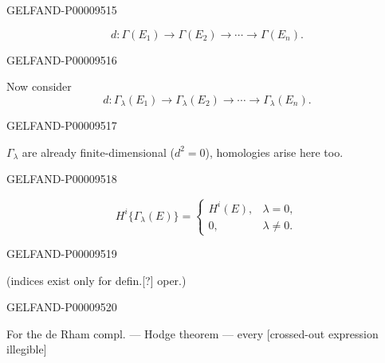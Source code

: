 \begin{GelfandAdjacentEvidence}{GELFAND-P000095}{15}

\begin{equation*}
d:\Gamma(E_1)\longrightarrow\Gamma(E_2)\longrightarrow\cdots\longrightarrow\Gamma(E_n).
\end{equation*}
\end{GelfandAdjacentEvidence}
\begin{GelfandAdjacentEvidence}{GELFAND-P000095}{16}

Now consider
\begin{equation*}
d:\Gamma_\lambda(E_1)\longrightarrow\Gamma_\lambda(E_2)\longrightarrow\cdots\longrightarrow\Gamma_\lambda(E_n).
\end{equation*}
\end{GelfandAdjacentEvidence}
\begin{GelfandAdjacentEvidence}{GELFAND-P000095}{17}

$\Gamma_\lambda$ are already finite-dimensional ($d^2=0$), homologies
arise here too.
\end{GelfandAdjacentEvidence}
\begin{GelfandAdjacentEvidence}{GELFAND-P000095}{18}

\begin{equation*}
H^i\{\Gamma_\lambda(E)\}=\begin{cases}H^i(E),&\lambda=0,\\0,&\lambda\ne0.\end{cases}
\end{equation*}
\end{GelfandAdjacentEvidence}
\begin{GelfandAdjacentEvidence}{GELFAND-P000095}{19}

(indices exist only for defin.[?] oper.)
\end{GelfandAdjacentEvidence}
\begin{GelfandAdjacentEvidence}{GELFAND-P000095}{20}

For the de Rham compl. — Hodge theorem — every [crossed-out expression illegible]
\end{GelfandAdjacentEvidence}
